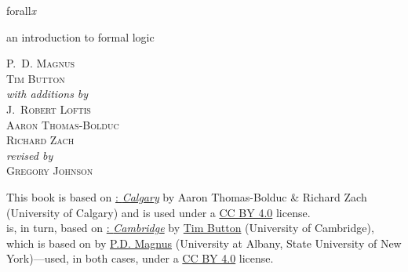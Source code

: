 

\pagestyle{empty}

\vspace*{80pt}

\begin{raggedleft}
\fontsize{34pt}{24pt}\sffamily
\selectfont
{forall\hspace{.08em}\fontsize{36pt}{24pt}\selectfont\rmfamily\textit{x}}

\smallskip\fontsize{16pt}{20pt}\sffamily\selectfont
\textcolor{maroon}{\uppercase{}}  

\bigskip\fontsize{16pt}{20pt}\selectfont

an introduction to formal logic

\vspace*{50pt}
\fontsize{10pt}{16pt}\selectfont \textsc{P.~D. Magnus}\\
\textsc{Tim Button}\\
\medskip
\textit{with additions by}\\
\textsc{J.~Robert Loftis}\\
\textsc{Aaron Thomas-Bolduc}\\ \textsc{Richard Zach}\\ 
\medskip
\textit{revised by}\\
\textsc{Gregory Johnson}

\vfill
\textcolor{maroon}{\forallxversion}\par
\end{raggedleft}


\newpage


\noindent \small This book is based on \href{http://forallx.openlogicproject.org/}{\forallx:\emph{ Calgary}} by {Aaron Thomas-Bolduc \& Richard Zach} ({University of Calgary}) and is used under a \href{https://creativecommons.org/licenses/by/4.0/}{CC BY 4.0} license.\\[1ex] 

 is, in turn, based on \href{http://people.ds.cam.ac.uk/tecb2/forallx.shtml}{\forallx:\emph{ Cambridge}} by \href{http://people.ds.cam.ac.uk/tecb2/index.shtml}{Tim Button} ({University of Cambridge}), 
which is based on \href{https://www.fecundity.com/logic/}{\forallx} by \href{https://www.fecundity.com/job/}{P.D. Magnus} (University at Albany, State University of New York)---used, in both cases, under a \href{https://creativecommons.org/licenses/by/4.0/}{CC BY 4.0} license.\\[1ex]


